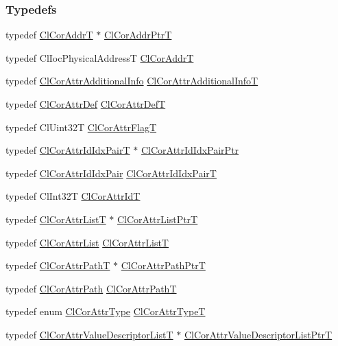 \subsubsection*{Typedefs}
\begin{CompactItemize}
\item 
typedef \hyperlink{group__group13_ga21}{Cl\-Cor\-Addr\-T} $\ast$ \hyperlink{group__group13_ga22}{Cl\-Cor\-Addr\-Ptr\-T}
\item 
typedef Cl\-Ioc\-Physical\-Address\-T \hyperlink{group__group13_ga21}{Cl\-Cor\-Addr\-T}
\item 
typedef \hyperlink{struct_cl_cor_attr_additional_info}{Cl\-Cor\-Attr\-Additional\-Info} \hyperlink{group__group13_ga12}{Cl\-Cor\-Attr\-Additional\-Info\-T}
\item 
typedef \hyperlink{struct_cl_cor_attr_def}{Cl\-Cor\-Attr\-Def} \hyperlink{group__group13_ga13}{Cl\-Cor\-Attr\-Def\-T}
\item 
typedef Cl\-Uint32T \hyperlink{group__group13_ga5}{Cl\-Cor\-Attr\-Flag\-T}
\item 
typedef \hyperlink{struct_cl_cor_attr_id_idx_pair}{Cl\-Cor\-Attr\-Id\-Idx\-Pair\-T} $\ast$ \hyperlink{group__group13_ga31}{Cl\-Cor\-Attr\-Id\-Idx\-Pair\-Ptr}
\item 
typedef \hyperlink{struct_cl_cor_attr_id_idx_pair}{Cl\-Cor\-Attr\-Id\-Idx\-Pair} \hyperlink{group__group13_ga30}{Cl\-Cor\-Attr\-Id\-Idx\-Pair\-T}
\item 
typedef Cl\-Int32T \hyperlink{group__group13_ga3}{Cl\-Cor\-Attr\-Id\-T}
\item 
typedef \hyperlink{struct_cl_cor_attr_list}{Cl\-Cor\-Attr\-List\-T} $\ast$ \hyperlink{group__group13_ga58}{Cl\-Cor\-Attr\-List\-Ptr\-T}
\item 
typedef \hyperlink{struct_cl_cor_attr_list}{Cl\-Cor\-Attr\-List} \hyperlink{group__group13_ga57}{Cl\-Cor\-Attr\-List\-T}
\item 
typedef \hyperlink{struct_cl_cor_attr_path}{Cl\-Cor\-Attr\-Path\-T} $\ast$ \hyperlink{group__group13_ga33}{Cl\-Cor\-Attr\-Path\-Ptr\-T}
\item 
typedef \hyperlink{struct_cl_cor_attr_path}{Cl\-Cor\-Attr\-Path} \hyperlink{group__group13_ga32}{Cl\-Cor\-Attr\-Path\-T}
\item 
typedef enum \hyperlink{group__group13_ga326}{Cl\-Cor\-Attr\-Type} \hyperlink{group__group13_ga10}{Cl\-Cor\-Attr\-Type\-T}
\item 
typedef \hyperlink{struct_cl_cor_attr_value_descriptor_list}{Cl\-Cor\-Attr\-Value\-Descriptor\-List\-T} $\ast$ \hyperlink{group__group13_ga48}{Cl\-Cor\-Attr\-Value\-Descriptor\-List\-Ptr\-T}

\end{CompactItemize}
